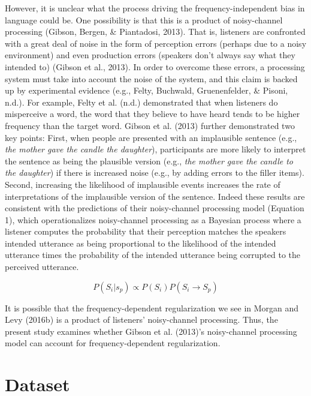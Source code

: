 \documentclass[
  jou,floatsintext]{apa6}
\begin{document}
However, it is unclear what the process driving the frequency-independent bias in language could be. One possibility is that this is a product of noisy-channel processing (Gibson, Bergen, \& Piantadosi, 2013). That is, listeners are confronted with a great deal of noise in the form of perception errors (perhaps due to a noisy environment) and even production errors (speakers don't always say what they intended to) (Gibson et al., 2013). In order to overcome these errors, a processing system must take into account the noise of the system, and this claim is backed up by experimental evidence (e.g., Felty, Buchwald, Gruenenfelder, \& Pisoni, n.d.). For example, Felty et al. (n.d.) demonstrated that when listeners do misperceive a word, the word that they believe to have heard tends to be higher frequency than the target word. Gibson et al. (2013) further demonstrated two key points: First, when people are presented with an implausible sentence (e.g., \emph{the mother gave the candle the daughter}), participants are more likely to interpret the sentence as being the plausible version (e.g., \emph{the mother gave the candle to the daughter}) if there is increased noise (e.g., by adding errors to the filler items). Second, increasing the likelihood of implausible events increases the rate of interpretations of the implausible version of the sentence. Indeed these results are consistent with the predictions of their noisy-channel processing model (Equation 1), which operationalizes noisy-channel processing as a Bayesian process where a listener computes the probability that their perception matches the speakers intended utterance as being proportional to the likelihood of the intended utterance times the probability of the intended utterance being corrupted to the perceived utterance.

\begin{equation}
\label{eq:gibsonnoisy}
P(S_i|s_p) \propto P(S_i) P(S_i \to S_p)
\end{equation}

It is possible that the frequency-dependent regularization we see in Morgan and Levy (2016b) is a product of listeners' noisy-channel processing. Thus, the present study examines whether Gibson et al. (2013)'s noisy-channel processing model can account for frequency-dependent regularization.

\section{Dataset}\label{dataset}
\end{document}
